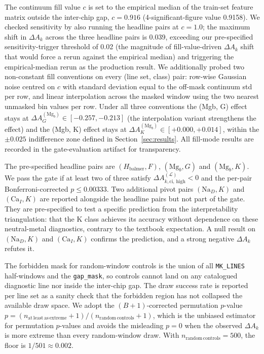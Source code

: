 \documentclass[11pt,a4paper]{article}
\newcommand{\dA}{\Delta A}
\begin{document}
The continuum fill value $c$ is set to the empirical median of the train-set feature matrix outside the inter-chip gap, $c = 0.916$ (4-significant-figure value 0.9158). We checked sensitivity by also running the headline pairs at $c = 1.0$; the maximum shift in $\dA_k$ across the three headline pairs is 0.039, exceeding our pre-specified sensitivity-trigger threshold of 0.02 (the magnitude of fill-value-driven $\dA_k$ shift that would force a rerun against the empirical median) and triggering the empirical-median rerun as the production result. We additionally probed two non-constant fill conventions on every (line set, class) pair: row-wise Gaussian noise centred on $c$ with standard deviation equal to the off-mask continuum std per row, and linear interpolation across the masked window using the two nearest unmasked bin values per row. Under all three conventions the (Mgb, G) effect stays at $\dA_G^{(\mathrm{Mg}_b)} \in [-0.257, -0.213]$ (the interpolation variant strengthens the effect) and the (Mgb, K) effect stays at $\dA_K^{(\mathrm{Mg}_b)} \in [+0.000, +0.014]$, within the $\pm 0.025$ indifference zone defined in Section~\ref{sec:results}. All fill-mode results are recorded in the gate-evaluation artifact for transparency.

The pre-specified headline pairs are $(H_{\mathrm{balmer}}, F)$, $(\mathrm{Mg}_b, G)$ and $(\mathrm{Mg}_b, K)$. We pass the gate if at least two of three satisfy $\dA^{(\mathcal{L})}_{k,\mathrm{ci,\,high}} < 0$ and the per-pair Bonferroni-corrected $p \leq 0.00333$. Two additional pivot pairs $(\mathrm{Na}_D, K)$ and $(\mathrm{Ca}_I, K)$ are reported alongside the headline pairs but not part of the gate. They are pre-specified to test a specific prediction from the interpretability triangulation: that the K class achieves its accuracy without dependence on these neutral-metal diagnostics, contrary to the textbook expectation. A null result on $(\mathrm{Na}_D, K)$ and $(\mathrm{Ca}_I, K)$ confirms the prediction, and a strong negative $\dA_k$ refutes it.

The forbidden mask for random-window controls is the union of all \texttt{MK\_LINES} half-windows and the \texttt{gap\_mask}, so controls cannot land on any catalogued diagnostic line nor inside the inter-chip gap. The draw success rate is reported per line set as a sanity check that the forbidden region has not collapsed the available draw space. We adopt the \citet{2010SAGMB...9...39P} $(B+1)$-corrected permutation $p$-value $p = (n_{\mathrm{at\,least\,as\,extreme}} + 1) / (n_{\mathrm{random\,controls}} + 1)$, which is the unbiased estimator for permutation $p$-values and avoids the misleading $p = 0$ when the observed $\dA_k$ is more extreme than every random-window draw. With $n_{\mathrm{random\,controls}} = 500$, the floor is $1/501 \approx 0.002$.
\end{document}
